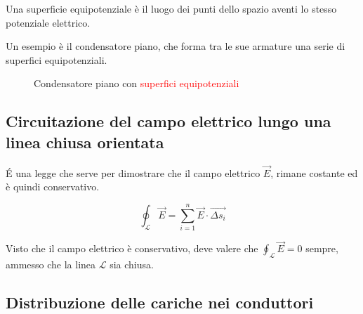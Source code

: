 Una superficie equipotenziale è il luogo dei punti dello spazio aventi lo stesso potenziale elettrico.

Un esempio è il condensatore piano, che forma tra le sue armature una serie di superfici equipotenziali.

\begin{figure}[H]
    \centering
    \caption{Condensatore piano con \textcolor{red}{superfici equipotenziali}}
\end{figure}

\subsection{Circuitazione del campo elettrico lungo una linea chiusa orientata}

É una legge che serve per dimostrare che il campo elettrico $\vec{E}$, rimane costante ed è quindi conservativo.

\begin{equation*}
    \oint_\mathcal{L} \vec{E} = \sum_{i = 1}^{n} \vec{E} \cdot \vec{\Delta s_i}
\end{equation*}

Visto che il campo elettrico è conservativo, deve valere che $\oint_\mathcal{L} \vec{E} = 0$ sempre, ammesso che la linea $\mathcal{L}$ sia chiusa.

\subsection{Distribuzione delle cariche nei conduttori}

